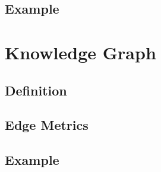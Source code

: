 \subsection{Example}
\label{subsec:hgraph_example}

\section{Knowledge Graph}
\subsection{Definition}
\label{subsec:kgraph_definition}
\subsection{Edge Metrics}
\label{subsec:edge_metrics}
\subsection{Example}
\label{subsec:kgraph_example}
